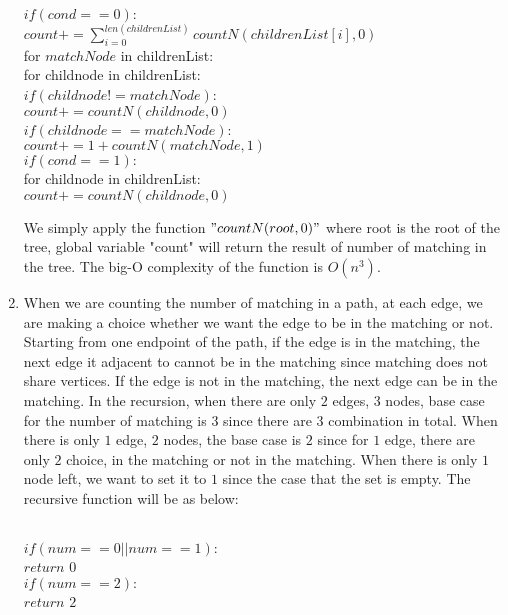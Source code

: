 \documentclass[11pt]{article}
\begin{document}
\begin{solution}
\begin{enumerate}
\begin{algorithm}
        \\  $ if(cond == 0):$\+
        \\      $count += \sum_{i = 0}^{len(childrenList)}     countN(childrenList[i],0)$ 
        \\      for $matchNode$ in childrenList:\+
        \\          for childnode in childrenList:\+
        \\              $if(childnode != matchNode)$:\+
        \\                  $count += countN(childnode,0)$\-
        \\              $if(childnode == matchNode)$:\+
        \\              $count += 1 + countN(matchNode,1)$\-\-\-\-
        \\  $ if(cond == 1):$\+
        \\      for childnode in childrenList:\+
        \\          $count += countN(childnode,0)$
        \end{algorithm}
        $$ $$
        We simply apply the function $"countN(root,0)"$ where root is the root of the tree, global variable "count" will return the result of number of matching in the tree. The big-O complexity of the function is $O(n^3)$.
    \item 
        When we are counting the number of matching in a path, at each edge, we are making a choice whether we want the edge to be in the matching or not. Starting from one endpoint of the path, if the edge is in the matching, the next edge it adjacent to cannot be in the matching since matching does not share vertices. If the edge is not in the matching, the next edge can be in the matching. In the recursion, when there are only $2$ edges, $3$ nodes, base case for the number of matching is $3$ since there are $3$ combination in total. When there is only $1$ edge, $2$ nodes, the base case is $2$ since for $1$ edge, there are only $2$ choice, in the matching or not in the matching. When there is only $1$ node left, we want to set it to $1$ since the case that the set is empty. The recursive function will be as below:
        $$ $$
        \begin{algorithm}
    	\+
        \\	$if(num == 0 || num == 1):$\+
        \\      $return$ $0$\-
        \\  $if(num == 2):$\+
        \\      $return$ $2$\-

\end{algorithm}
\end{enumerate}
\end{solution}
\end{document}
